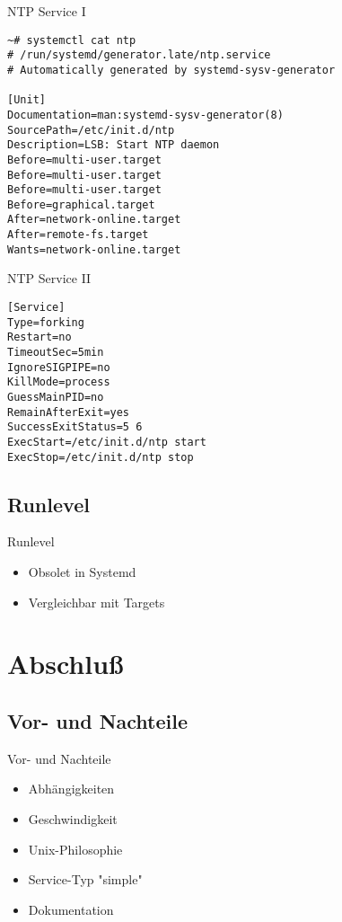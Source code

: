 \begin{frame}[fragile]{NTP Service I}
\begin{lstlisting}
~# systemctl cat ntp
# /run/systemd/generator.late/ntp.service
# Automatically generated by systemd-sysv-generator

[Unit]
Documentation=man:systemd-sysv-generator(8)
SourcePath=/etc/init.d/ntp
Description=LSB: Start NTP daemon
Before=multi-user.target
Before=multi-user.target
Before=multi-user.target
Before=graphical.target
After=network-online.target
After=remote-fs.target
Wants=network-online.target
\end{lstlisting}
\end{frame}

\begin{frame}[fragile]{NTP Service II}
\begin{lstlisting}
[Service]
Type=forking
Restart=no
TimeoutSec=5min
IgnoreSIGPIPE=no
KillMode=process
GuessMainPID=no
RemainAfterExit=yes
SuccessExitStatus=5 6
ExecStart=/etc/init.d/ntp start
ExecStop=/etc/init.d/ntp stop
\end{lstlisting}
\end{frame}

\subsection{Runlevel}

\begin{frame}{Runlevel}
\begin{itemize}
\item Obsolet in Systemd
\item Vergleichbar mit Targets
\end{itemize}	
\end{frame}

\section{Abschluß}
\subsection{Vor- und Nachteile}

\begin{frame}{Vor- und Nachteile}
\begin{itemize}
\item[\goodsmile] Abhängigkeiten
\item[\goodsmile] Geschwindigkeit
\item[\neutralsmile] Unix-Philosophie	
\item[\sadsmile] Service-Typ "simple"	
\item[\sadsmile] Dokumentation
\end{itemize}
\end{frame}


